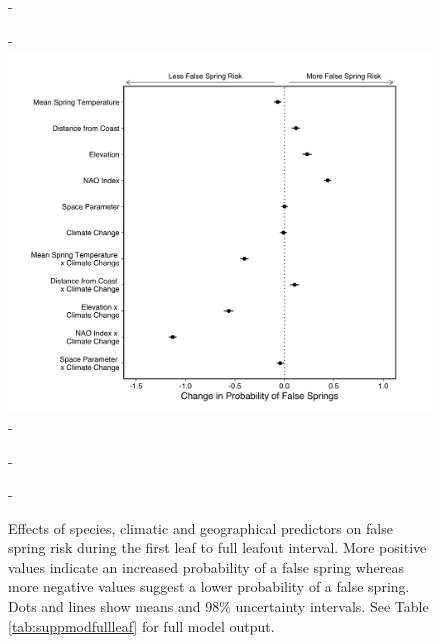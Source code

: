 \documentclass{article}\usepackage[]{graphicx}\usepackage[]{color}
\begin{document}
{\begin{figure} [H]
  -\begin{center}
  -\includegraphics[width=12cm]{..//analyses/figures/model_output_98_fullleaf.png}
  -\caption{Effects of species, climatic and geographical predictors on false spring risk during the first leaf to full leafout interval. More positive values indicate an increased probability of a false spring whereas more negative values suggest a lower probability of a false spring. Dots and lines show means and 98\% uncertainty intervals. See Table \ref{tab:suppmodfullleaf} for full model output. }\label{fig:dvr}
  -\end{center}
  -\end{figure}}
  
\end{document}
